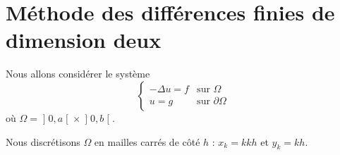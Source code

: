 \section{Méthode des différences finies de dimension deux}

Nous allons considérer le système
\begin{equation}        
     \begin{cases}
         -\Delta u=f    &   \text{sur } \Omega\\
         u=g            &   \text{sur } \partial\Omega
     \end{cases}
\end{equation}
où \( \Omega=\mathopen] 0 , a \mathclose[\times \mathopen] 0 , b \mathclose[\).

Nous discrétisons \( \Omega\) en mailles carrés de côté \( h\) : \( x_k=kkh\) et \( y_k=kh\).


